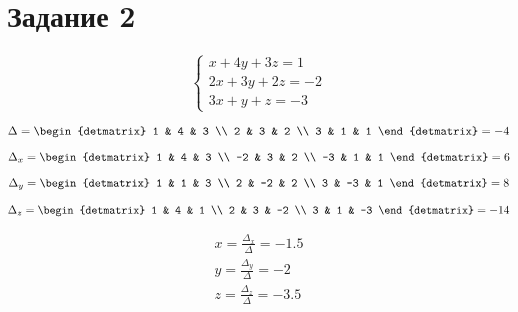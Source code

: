 \documentclass[12pt, a4paper]{article}
\begin{document}
 
    \section{Задание 2}


    \begin{equation}
        \begin{cases}
            x + 4y + 3z = 1 \\
            2x + 3y + 2z = -2 \\
            3x + y + z = -3
        \end{cases}
    \end{equation}

    \begin{equation}
        \Delta = \begin{detmatrix}
            1 & 4 & 3 \\
            2 & 3 & 2 \\
            3 & 1 & 1
        \end{detmatrix} = -4
    \end{equation}

    \begin{equation}
        \Delta_x = \begin{detmatrix}
            1 & 4 & 3 \\
            -2 & 3 & 2 \\
            -3 & 1 & 1
        \end{detmatrix} = 6
    \end{equation}

    \begin{equation}
        \Delta_y = \begin{detmatrix}
            1 & 1 & 3 \\
            2 & -2 & 2 \\
            3 & -3 & 1
        \end{detmatrix} = 8
    \end{equation}


    \begin{equation}
        \Delta_z = \begin{detmatrix}
            1 & 4 & 1 \\
            2 & 3 & -2 \\
            3 & 1 & -3
        \end{detmatrix} = -14
    \end{equation}

    \begin{gather}
        x = \frac{\Delta_x}{\Delta} = -1.5 \\
        y = \frac{\Delta_y}{\Delta} = -2 \\
        z = \frac{\Delta_z}{\Delta} = -3.5 \\
    \end{gather}
\end{document}
